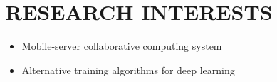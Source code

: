 \section*{RESEARCH INTERESTS}

\begin{itemize}[leftmargin=12pt, label={-}]
    \item Mobile-server collaborative computing system
    \item Alternative training algorithms for deep learning
\end{itemize}